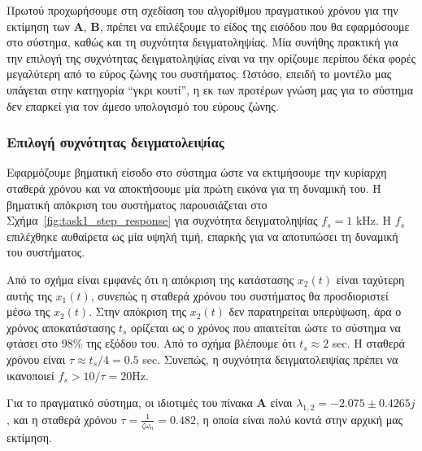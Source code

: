 \documentclass[a4paper,12pt]{article}
\begin{document}
Πρωτού προχωρήσουμε στη σχεδίαση του αλγορίθμου πραγματικού χρόνου για την εκτίμηση των 
$\mathbf{A}, \, \mathbf{B}$, πρέπει να επιλέξουμε το είδος της εισόδου που θα εφαρμόσουμε 
στο σύστημα, καθώς και τη συχνότητα δειγματοληψίας. Μία συνήθης πρακτική για την επιλογή της 
συχνότητας δειγματοληψίας είναι να την ορίζουμε περίπου δέκα φορές μεγαλύτερη από το εύρος 
ζώνης του συστήματος. Ωστόσο, επειδή το μοντέλο μας υπάγεται στην κατηγορία ``γκρι κουτί'', 
η εκ των προτέρων γνώση μας για το σύστημα δεν επαρκεί για τον άμεσο υπολογισμό του εύρους ζώνης.

\subsubsection*{Επιλογή συχνότητας δειγματολειψίας}

Εφαρμόζουμε βηματική είσοδο στο σύστημα ώστε να εκτιμήσουμε την κυρίαρχη σταθερά χρόνου  
και να αποκτήσουμε μία πρώτη εικόνα για τη δυναμική του. Η βηματική απόκριση του συστήματος  
παρουσιάζεται στο Σχήμα~\ref{fig:task1_step_response} για συχνότητα δειγματοληψίας $f_s = 1$
kHz. Η $f_s$ επιλέχθηκε αυθαίρετα ως μία υψηλή τιμή, 
επαρκής για να αποτυπώσει τη δυναμική του συστήματος.

Από το σχήμα είναι εμφανές ότι η απόκριση της κατάστασης $x_2(t)$ είναι ταχύτερη αυτής της $x_1(t)$,
συνεπώς η σταθερά χρόνου του συστήματος θα προσδιοριστεί μέσω της $x_2(t)$. Στην απόκριση της
$x_2(t)$ δεν παρατηρείται υπερύψωση, άρα ο χρόνος αποκατάστασης $t_s$ ορίζεται ως ο χρόνος που απαιτείται
ώστε το σύστημα να φτάσει στο $98\%$ της εξόδου του. Από το σχήμα βλέπουμε ότι $t_s \approx 2$
sec. Η σταθερά χρόνου είναι $\tau \approx t_s / 4 = 0.5$
sec. Συνεπώς, η συχνότητα δειγματολειψίας πρέπει να 
ικανοποιεί $f_s > 10 / \tau = 20$Hz.

Για το πραγματικό σύστημα, οι ιδιοτιμές του πίνακα $\mathbf{A}$ είναι $\lambda_{1,2} = -2.075 \pm 0.4265j$, 
και η σταθερά χρόνου $\tau = \frac{1}{\zeta \omega_n} = 0.482$, η οποία είναι πολύ κοντά στην αρχική 
μας εκτίμηση.
\end{document}

